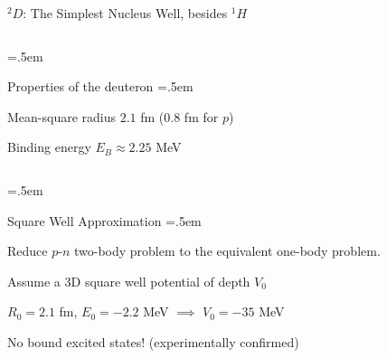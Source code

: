 \documentclass[xcolor={dvipsnames}]{beamer}
\let\olditemize=\itemize
\let\endolditemize=\enditemize
\renewenvironment{itemize}{\olditemize \itemsep=.5em }{\endolditemize}
\begin{document}
\begin{frame}{${}^2D$: The Simplest Nucleus}
\alert{Well, besides ${}^1H$}
\begin{columns}[totalwidth=\textwidth]
    \begin{column}{.75\textwidth}
        \hspace{10em}
        \begin{itemize}
            \item<2-> Properties of the deuteron
            \begin{itemize}
                \item<3-> Mean-square radius $2.1$ fm (0.8 fm for $p$)
                \item<4-> Binding energy $E_B \approx 2.25$ MeV
            \end{itemize}
        \end{itemize}
    \end{column}
    \begin{column}{.25\textwidth}
    \end{column}
\end{columns}
\begin{itemize}
    \item<5-> Square Well Approximation
    \begin{itemize}
        \item<6-> Reduce $p$-$n$ two-body problem to the equivalent one-body problem.
        \item<7-> Assume a 3D square well potential of depth $V_0$
        \item<8-> $R_0 = 2.1$ fm, $E_0 = -2.2$ MeV $\implies$ $V_0 = -35$ MeV 
        \item<9-> No bound excited states! (experimentally confirmed)
    \end{itemize}
\end{itemize}
\end{frame}
\end{document}
